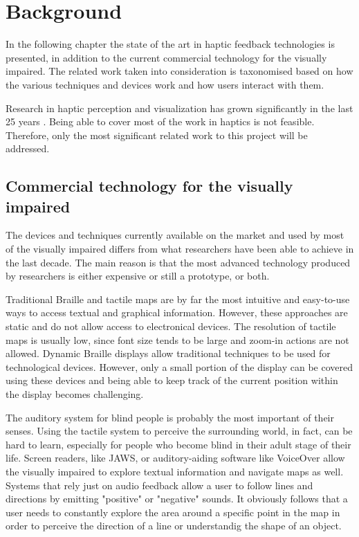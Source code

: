 \chapter{Background}

In the following chapter the state of the art in haptic feedback technologies is presented, in addition to the current commercial technology for the visually impaired. The related work taken into consideration is taxonomised based on how the various techniques and devices work and how users interact with them.

Research in haptic perception and visualization has grown significantly in the last 25 years \cite{roberts2007we}. Being able to cover most of the work in haptics is not feasible. Therefore, only the most significant related work to this project will be addressed.

\section{Commercial technology for the visually impaired}
The devices and techniques currently available on the market and used by most of the visually impaired differs from what researchers have been able to achieve in the last decade. The main reason is that the most advanced technology produced by researchers is either expensive or still a prototype, or both. 

Traditional Braille and tactile maps are by far the most intuitive and easy-to-use ways to access textual and graphical information. However, these approaches are static and do not allow access to electronical devices. The resolution of tactile maps is usually low, since font size tends to be large and zoom-in actions are not allowed. Dynamic Braille displays \cite{HumanWare, shimada2010development, blindMaps} allow traditional techniques to be used for technological devices. However, only a small portion of the display can be covered using these devices and being able to keep track of the current position within the display becomes challenging.

The auditory system for blind people is probably the most important of their senses. Using the tactile system to perceive the surrounding world, in fact, can be hard to learn, especially for people who become blind in their adult stage of their life. Screen readers, like JAWS, or auditory-aiding software like VoiceOver\cite{voiceOver} allow the visually impaired to explore textual information and navigate maps as well. Systems that rely just on audio feedback allow a user to follow lines and directions by emitting "positive" or "negative" sounds. It obviously follows that a user needs to constantly explore the area around a specific point in the map in order to perceive the direction of a line or understandig the shape of an object.    
    
